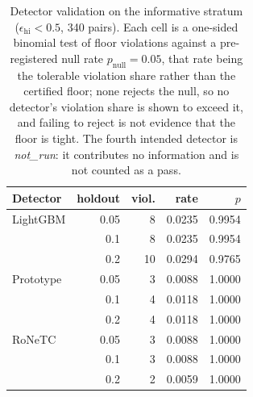 \documentclass[sigconf,anonymous,review]{acmart}
\newcommand{\epshi}{\ensuremath{\epsilon_{\mathrm{hi}}}}
\newcommand{\ptest}{\ensuremath{p_{\mathrm{null}}}}
\begin{document}
\begin{table}[t]
\centering
\caption{Detector validation on the informative stratum ($\epshi < 0.5$, 340 pairs). Each cell is a one-sided binomial test of floor violations against a pre-registered null rate $\ptest = 0.05$, that rate being the tolerable violation share rather than the certified floor; none rejects the null, so no detector's violation share is shown to exceed it, and failing to reject is not evidence that the floor is tight. The fourth intended detector is \emph{not\_run}: it contributes no information and is not counted as a pass.}
\label{tab:detectors}
\begin{tabular}{lrrrr}
\toprule
Detector & holdout & viol. & rate & $p$ \\
\midrule
LightGBM & 0.05 & 8 & 0.0235 & 0.9954 \\
 & 0.1 & 8 & 0.0235 & 0.9954 \\
 & 0.2 & 10 & 0.0294 & 0.9765 \\
\midrule
Prototype & 0.05 & 3 & 0.0088 & 1.0000 \\
 & 0.1 & 4 & 0.0118 & 1.0000 \\
 & 0.2 & 4 & 0.0118 & 1.0000 \\
\midrule
RoNeTC & 0.05 & 3 & 0.0088 & 1.0000 \\
 & 0.1 & 3 & 0.0088 & 1.0000 \\
 & 0.2 & 2 & 0.0059 & 1.0000 \\
\bottomrule
\end{tabular}
\end{table}

\makeatletter
\renewcommand{\bibfont}{\footnotesize}
\setlength{\bibsep}{1.2pt plus 0.2ex}
\makeatother





\end{document}
